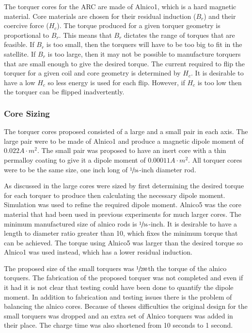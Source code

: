 The torquer cores for the \ac{ARC} are made of Alnico1, which is a hard magnetic material. Core materials are chosen for their residual induction ($B_r$) and their coercive force ($H_c$). The torque produced for a given torquer geometry is proportional to $B_r$. This means that $B_r$ dictates the range of torques that are feasible. If $B_r$ is too small, then the torquers will have to be too big to fit in the satellite. If $B_r$ is too large, then it may not be possible to manufacture torquers that are small enough to give the desired torque. The current required to flip the torquer for a given coil and core geometry is determined by $H_c$. It is desirable to have a low $H_c$ so less energy is used for each flip. However, if $H_c$ is too low then the torquer can be flipped inadvertently.

\subsubsection{Core Sizing}

The torquer cores proposed \cite{Mentch11} consisted of a large and a small pair in each axis. The large pair were to be made of Alnico1 and produce a magnetic dipole moment of $0.022 \unit{A \cdot m^2}$. The small pair was proposed to have an inert core with a thin permalloy coating to give it a dipole moment of $0.00011 \unit{A \cdot m^2}$. All torquer cores were to be the same size, one inch long of $\sfrac{1}{16}$-inch diameter rod.

As discussed in \cite{Mentch11} the large cores were sized by first determining the desired torque for each torquer to produce then calculating the necessary dipole moment. Simulation was used to refine the required dipole moment. Alnico5 was the core material that had been used in previous experiments for much larger cores\cite{Mentch11}. The minimum manufactured size of alnico rods is $\sfrac{1}{16}$-inch. It is desirable to have a length to diameter ratio greater than 10, which fixes the minimum torque that can be achieved. The torque using Alnico5 was larger than the desired torque so Alnico1 was used instead, which has a lower residual induction. 

The proposed size of the small torquers was $\sfrac{1}{200}$th the torque of the alnico torquers. The fabrication of the proposed torquer was not completed and even if it had it is not clear that testing could have been done to quantify the dipole moment. In addition to fabrication and testing issues there is the problem of balancing the alnico cores. Because of theses difficulties the original design for the small torquers was dropped and an extra set of Alnico torquers was added in their place. The charge time was also shortened from 10 seconds to 1 second.

